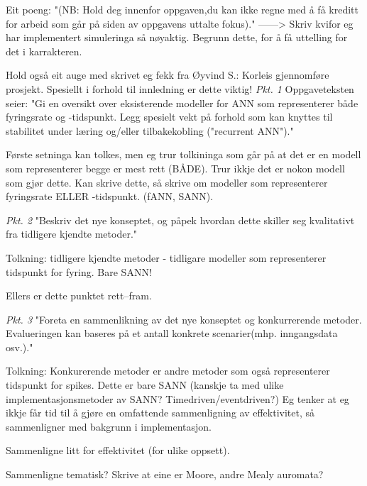 \documentclass[b5paper,11 pt]{report}
\begin{document}
Eit poeng: "(NB: Hold deg innenfor oppgaven,du kan ikke regne med å få
kreditt for arbeid som går på siden av oppgavens uttalte fokus)."
------> Skriv kvifor eg har implementert simuleringa så nøyaktig. Begrunn dette, for å få uttelling for det i karrakteren. 

Hold også eit auge med skrivet eg fekk fra Øyvind S.: Korleis gjennomføre prosjekt. Spesiellt i forhold til innledning er dette viktig!
	\emph{Pkt. 1}
Oppgaveteksten seier: "Gi en oversikt over eksisterende modeller for ANN som representerer både fyringsrate og -tidspunkt. 
Legg spesielt vekt på forhold som kan knyttes til stabilitet under læring og/eller tilbakekobling ("recurrent ANN")."

Første setninga kan tolkes, men eg trur tolkininga som går på at det er en modell som representerer begge er mest rett (BÅDE). 
Trur ikkje det er nokon modell som gjør dette. Kan skrive dette, så skrive om modeller som representerer fyringsrate ELLER -tidspunkt. (fANN, SANN).


	\emph{Pkt. 2}
"Beskriv det nye konseptet, og påpek hvordan dette skiller seg kvalitativt fra tidligere kjendte metoder."

Tolkning: tidligere kjendte metoder - tidligare modeller som representerer tidspunkt for fyring. Bare SANN!

Ellers er dette punktet rett--fram.

	\emph{Pkt. 3}
"Foreta en sammenlikning av det nye konseptet og konkurrerende metoder. Evalueringen kan baseres på et antall konkrete scenarier(mhp. inngangsdata osv.)."

Tolkning:
Konkurerende metoder er andre metoder som også representerer tidspunkt for spikes. Dette er bare SANN (kanskje ta med ulike implementasjonsmetoder av SANN? Timedriven/eventdriven?)
Eg tenker at eg ikkje får tid til å gjøre en omfattende sammenligning av effektivitet, så sammenligner med bakgrunn i implementasjon. 

Sammenligne litt for effektivitet (for ulike oppsett).

Sammenligne tematisk? Skrive at eine er Moore, andre Mealy auromata?

\newpage

%
%
\end{document}

